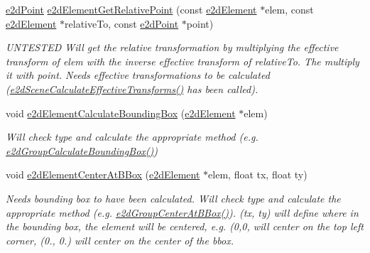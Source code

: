 \begin{DoxyCompactItemize}
\hyperlink{structe2dPoint}{e2d\-Point} \hyperlink{group__e2dElement_gac3ad9f8cdc0782378c9f2e93cb7da68f}{e2d\-Element\-Get\-Relative\-Point} (const \hyperlink{structe2dElement}{e2d\-Element} $\ast$elem, const \hyperlink{structe2dElement}{e2d\-Element} $\ast$relative\-To, const \hyperlink{structe2dPoint}{e2d\-Point} $\ast$point)
\begin{DoxyCompactList}\small\item\em U\-N\-T\-E\-S\-T\-E\-D Will get the relative transformation by multiplying the effective transform of elem with the inverse effective transform of relative\-To. The multiply it with point. Needs effective transformations to be calculated (\hyperlink{group__e2dScene_gac4b32991ff8bab5d5ae429fb97b4e26c}{e2d\-Scene\-Calculate\-Effective\-Transforms()} has been called). \end{DoxyCompactList}\item 
void \hyperlink{group__e2dElement_ga94aa710b2da71af2091fe4d5b87ce47e}{e2d\-Element\-Calculate\-Bounding\-Box} (\hyperlink{structe2dElement}{e2d\-Element} $\ast$elem)
\begin{DoxyCompactList}\small\item\em Will check type and calculate the appropriate method (e.\-g. \hyperlink{group__e2dGroup_ga7c5f43489bbd2d36a51414aee07abf5a}{e2d\-Group\-Calculate\-Bounding\-Box()}) \end{DoxyCompactList}\item 
void \hyperlink{group__e2dElement_ga36b01a888c97163c990e16d348aff61c}{e2d\-Element\-Center\-At\-B\-Box} (\hyperlink{structe2dElement}{e2d\-Element} $\ast$elem, float tx, float ty)
\begin{DoxyCompactList}\small\item\em Needs bounding box to have been calculated. Will check type and calculate the appropriate method (e.\-g. \hyperlink{group__e2dGroup_ga04bf94419865ca7f9d6daf30ce3fadf0}{e2d\-Group\-Center\-At\-B\-Box()}). (tx, ty) will define where in the bounding box, the element will be centered, e.\-g. (0,0, will center on the top left corner, (0., 0.) will center on the center of the bbox. \end{DoxyCompactList}\end{DoxyCompactItemize}


